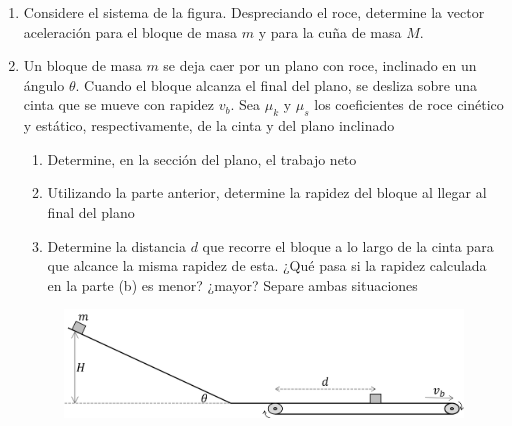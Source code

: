 \documentclass[letterpaper,11pt]{article}
\begin{document}
\begin{enumerate}
\item Considere el sistema de la figura. Despreciando el roce, determine la vector aceleración para el bloque de masa $m$ y para la cuña de masa $M$.

\begin{figure}[H]
    \centering
    
\end{figure}


%   

\item Un bloque de masa $m$ se deja caer por un plano con roce, inclinado en un ángulo $\theta$. Cuando el bloque alcanza el final del plano, se desliza sobre una cinta que se mueve con rapidez $v_b$. Sea $\mu_k$ y $\mu_s$ los coeficientes de roce cinético y estático, respectivamente, de la cinta y del plano inclinado

\begin{minipage}{0.52\linewidth}
    \begin{enumerate}
        \item Determine, en la sección del plano, el trabajo neto
        
        \item Utilizando la parte anterior, determine la rapidez del bloque al llegar al final del plano
        
        \item Determine la distancia $d$ que recorre el bloque a lo largo de la cinta para que alcance la misma rapidez de esta. ¿Qué pasa si la rapidez calculada en la parte (b) es menor? ¿mayor? Separe ambas situaciones
    \end{enumerate}
\end{minipage}
\hfill
\begin{minipage}{0.47\linewidth}
    \begin{figure}[H]
        \centering
        \includegraphics[width=1\linewidth]{2023-1/img/TD 3/cinta.png}
    \end{figure}
\end{minipage}


\end{enumerate}
\end{document}
